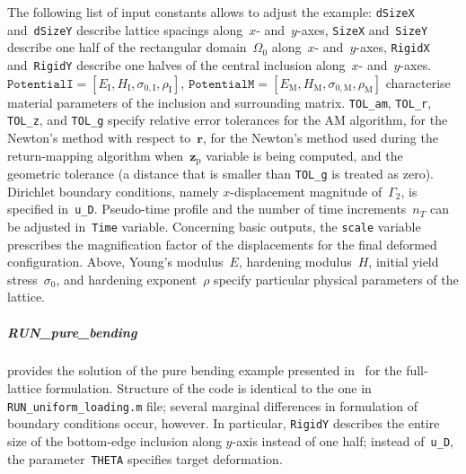 \documentclass[preprint,12pt,authoryear]{elsarticle}
\newcommand{\bs}[1]{{\boldsymbol{#1}}}
\begin{document}
The following list of input constants allows to adjust the example: \texttt{dSizeX} and~\texttt{dSizeY} describe lattice spacings along~$x$- and~$y$-axes, \texttt{SizeX} and~\texttt{SizeY} describe one half of the rectangular domain~$\Omega_0$ along~$x$- and~$y$-axes, \texttt{RigidX} and~\texttt{RigidY} describe one halves of the central inclusion along~$x$- and~$y$-axes. $\texttt{PotentialI}=[E_\mathrm{I},H_\mathrm{I},\sigma_{0,\mathrm{I}},\rho_\mathrm{I}]$, $\texttt{PotentialM}=[E_\mathrm{M},H_\mathrm{M},\sigma_{0,\mathrm{M}},\rho_\mathrm{M}]$ characterise material parameters of the inclusion and surrounding matrix. \texttt{TOL\_am}, \texttt{TOL\_r}, \texttt{TOL\_z}, and \texttt{TOL\_g} specify relative error tolerances for the AM algorithm, for the Newton's method with respect to~$\bs{r}$, for the Newton's method used during the return-mapping algorithm when~$\bs{z}_\mathrm{p}$ variable is being computed, and the geometric tolerance (a distance that is smaller than \texttt{TOL\_g} is treated as zero). Dirichlet boundary conditions, namely $x$-displacement magnitude of~$\Gamma_2$, is specified in~\texttt{u\_D}. Pseudo-time profile and the number of time increments~$n_T$ can be adjusted in~\texttt{Time} variable. Concerning basic outputs, the \texttt{scale} variable prescribes the magnification factor of the displacements for the final deformed configuration. Above, Young's modulus~$E$, hardening modulus~$H$, initial yield stress~$\sigma_0$, and hardening exponent~$\rho$ specify particular physical parameters of the lattice.
%
%
\subparagraph{RUN\_pure\_bending} provides the solution of the pure bending example presented in~\cite[Section~5.2]{RokosQC} for the full-lattice formulation. Structure of the code is identical to the one in \texttt{RUN\_uniform\_loading.m} file; several marginal differences in formulation of boundary conditions occur, however. In particular, \texttt{RigidY} describes the entire size of the bottom-edge inclusion along $y$-axis instead of one half; instead of~\texttt{u\_D}, the parameter~\texttt{THETA} specifies target deformation.
%
%
\end{document}
